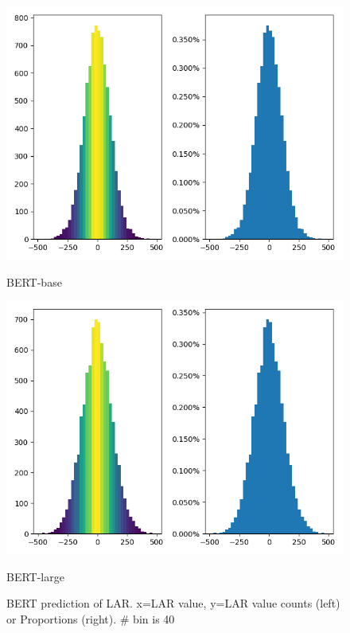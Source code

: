 \documentclass[letterpaper]{article} %
\begin{document}
\begin{figure}[!]
\centering
\begin{minipage}[b]{0.45\textwidth}
    \includegraphics[width=\textwidth]{SWOW_bert.png}
    \caption*{BERT-base}
  \end{minipage}
  \hfill
  \begin{minipage}[b]{0.45\textwidth}
    \includegraphics[width=\textwidth]{SWOW_bert_large.png}
    \caption*{BERT-large}
  \end{minipage}
 
\caption{BERT prediction of LAR. x=LAR value, y=LAR value counts (left) or Proportions (right). \# bin is 40}
\label{fig:larbert}
\end{figure}
\end{document}
